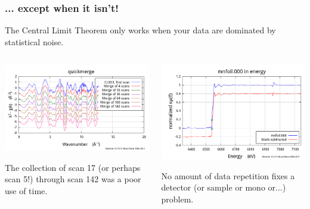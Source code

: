 \documentclass[10pt, xcolor=x11names, compress]{beamer}
\begin{document}
\begin{frame}
  \frametitle{... except when it isn't!}
  \begin{alertblock}{}
    The Central Limit Theorem only works when your data are dominated
    by statistical noise.
  \end{alertblock}

  \begin{columns}[T]
    \begin{column}{0.5\linewidth}
      \includegraphics[width=\linewidth]{images/cr2o3.png}

      \bigskip

      The collection of scan 17 (or perhaps scan 5!) through scan 142
      was a poor use of time.
    \end{column}
    \begin{column}{0.5\linewidth}
      \includegraphics[width=\linewidth]{images/mnxmu.png}  

      \bigskip
    
      No amount of data repetition fixes a detector (or sample
      or mono or...) problem.
    \end{column}
  \end{columns}
\end{frame}
\end{document}
